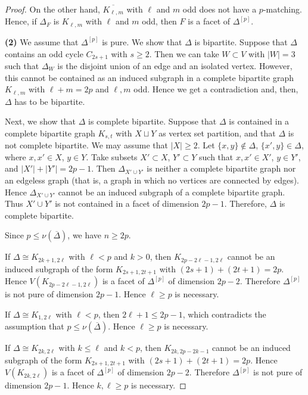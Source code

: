 \documentclass[10pt,a4paper]{amsart}
\begin{document}
\begin{proof}
On the other hand, $\overline{K_{\ell,m}}$ with $\ell$ and $m$ odd does not have a $p$-matching. Hence, if $\Delta_F$ is $K_{\ell,m}$ with $\ell$ and $m$ odd, then $F$ is a facet of $\Delta^{[p]}$.

\textbf{(2)}
We assume that $\Delta^{[p]}$ is pure.
We show that $\Delta$ is bipartite.
Suppose that $\Delta$ contains an odd cycle $C_{2s+1}$ with $s \ge 2$.
Then we can take $W \subset V$ with $|W| = 3$ such that $\Delta_W$ is the disjoint union of
an edge and an isolated vertex. However, this cannot be contained as an induced subgraph in a complete bipartite graph $K_{\ell,m}$ with $\ell + m = 2p$ and $\ell, m$ odd. Hence we get a contradiction and, then, $\Delta$ has to be bipartite.

Next, we show that $\Delta$ is complete bipartite.
Suppose that $\Delta$ is contained in a complete bipartite graph $K_{s,t}$ with
$X \sqcup Y$ as vertex set partition, and that $\Delta$ is not complete bipartite.
We may assume that $|X| \ge 2$. Let $\{x, y\} \notin \Delta$, $\{x', y\} \in \Delta$, where $x, x' \in X$, $y \in Y$.
Take subsets $X' \subset X$, $Y' \subset Y$ such that $x, x' \in X'$, $y \in Y'$, and $|X'| + |Y'| = 2p-1$.
Then $\Delta_{X' \cup Y'}$ is neither a complete bipartite graph nor an edgeless graph (that is, a graph in which no vertices are connected by edges). Hence $\Delta_{X' \cup Y'}$ cannot be an induced subgraph of a complete bipartite graph.
Thus $X' \cup Y'$ is not contained in a facet of dimension $2p-1$.
Therefore, $\Delta$ is complete bipartite.

Since $p \leq \nu(\overline{\Delta})$, we have $n \ge 2p$.

If $\Delta \cong K_{2k+1,2\ell}$ with $\ell < p$ and $k > 0$, then 
$K_{2p-2\ell-1,2\ell}$ cannot be an induced subgraph of the form 
$K_{2s+1, 2t+1}$ with $(2s+1) + (2t+1) = 2p$.
Hence $V(K_{2p-2\ell-1,2\ell})$ is a facet of $\Delta^{[p]}$ of dimension $2p-2$. Therefore $\Delta^{[p]}$ is not pure of dimension $2p-1$.
Hence $\ell \ge p$ is necessary.

If $\Delta \cong K_{1,2\ell}$ with $\ell < p$, then $2\ell + 1 \le 2p-1$,
which contradicts the assumption that $p \leq \nu(\overline{\Delta})$.
Hence $\ell \ge p$ is necessary.

If $\Delta \cong K_{2k,2\ell}$ with $k \le \ell$ and $k < p$,
then $K_{2k,2p-2k-1}$ cannot be an induced subgraph of the form 
$K_{2s+1, 2t+1}$ with $(2s+1) + (2t+1) = 2p$.
Hence $V(K_{2k,2\ell})$ is a facet of $\Delta^{[p]}$ of dimension $2p-2$. Therefore $\Delta^{[p]}$ is not pure of dimension $2p-1$.
Hence $k, \ell \ge p$ is necessary.


\end{proof}
\end{document}
